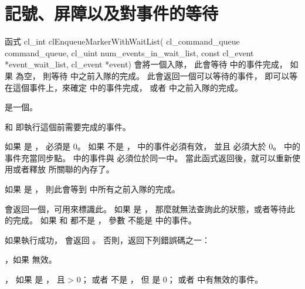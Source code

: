 \section{記號、屏障以及對事件的等待}

函式
\startCLFUNC
cl_int clEnqueueMarkerWithWaitList(
			cl_command_queue command_queue,
			cl_uint num_events_in_wait_list,
			const cl_event *event_wait_list,
			cl_event *event)
\stopCLFUNC
會將一個入隊，
此會等待  中的事件完成，
如果  為空，
則等待  中之前入隊的完成。
此會返回一個可以等待的事件，
即可以等在這個事件上，來確定  中的事件完成，
或者  中之前入隊的完成。

 是一個。

 和 
 即執行這個前需要完成的事件。

如果  是 ，
  必須是 0。
如果  不是 ，
  中的事件必須有效，
並且  必須大於 0。
  中的事件充當同步點。
  中的事件與  必須位於同一中。
當此函式返回後，就可以重新使用或者釋放  所關聯的內存了。

如果  是 ，
則此會等到  中所有之前入隊的完成。

 會返回一個，可用來標識此。
如果  是 ，
那麼就無法查詢此的狀態，或者等待此的完成。
如果  和  都不是 ，
參數  不能是  中的事件。

如果執行成功，  會返回 。
否則，返回下列錯誤碼之一：
\startigBase
\item {}，如果  無效。

\item {}，
如果  是 ，
且  > 0；
或者  不是 ，
但  是 0；
或者  中有無效的事件。

